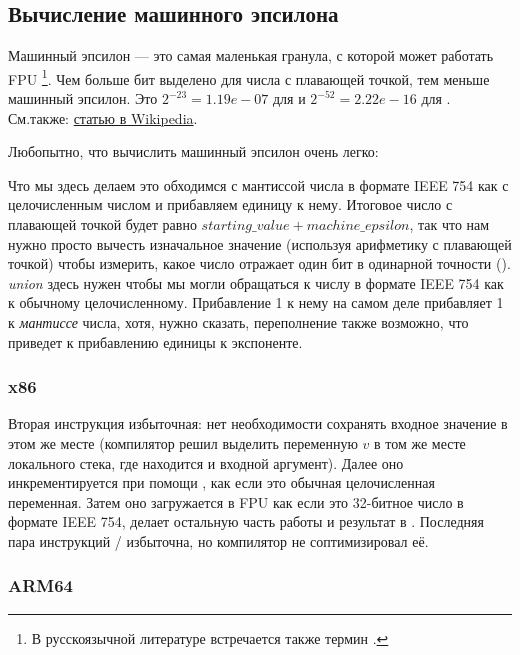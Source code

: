 ﻿\subsection{Вычисление машинного эпсилона}

Машинный эпсилон --- это самая маленькая гранула, с которой может работать \ac{FPU} 
\footnote{В русскоязычной литературе встречается также термин .}.
Чем больше бит выделено для числа с плавающей точкой, тем меньше машинный эпсилон.
Это $2^{-23} = 1.19e-07$ для \Tfloat и $2^{-52} = 2.22e-16$ для \Tdouble.
См.также: \href{http://archive.is/mC6PO}{статью в Wikipedia}.

Любопытно, что вычислить машинный эпсилон очень легко:



Что мы здесь делаем это обходимся с мантиссой числа в формате IEEE 754 как с целочисленным числом и прибавляем
единицу к нему.
Итоговое число с плавающей точкой будет равно $starting\_value+machine\_epsilon$, так что нам
нужно просто вычесть изначальное значение (используя арифметику с плавающей точкой) чтобы измерить, 
какое число отражает один бит в одинарной точности (\Tfloat).
\emph{union} здесь нужен чтобы мы могли обращаться к числу в формате IEEE 754 как к обычному целочисленному.
Прибавление 1 к нему на самом деле прибавляет 1 к \emph{мантиссе} числа, хотя, нужно сказать,
переполнение также возможно, что приведет к прибавлению единицы к экспоненте.

\subsubsection{x86}



Вторая инструкция  избыточная: нет необходимости сохранять входное значение в этом же месте
(компилятор решил выделить переменную $v$ в том же месте локального стека, где находится и 
входной аргумент).
Далее оно инкрементируется при помощи , как если это обычная целочисленная переменная.
Затем оно загружается в FPU как если это 32-битное число в формате IEEE 754,  делает остальную
часть работы и результат в .
Последняя пара инструкций / избыточна, но компилятор не соптимизировал её.

\subsubsection{ARM64}

